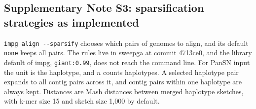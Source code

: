 \subsection*{Supplementary Note S3: sparsification strategies as implemented}

\texttt{impg align -{}-sparsify} chooses which pairs of genomes to align, and its default \texttt{none} keeps all pairs.
The rules live in sweepga \citep{Garrison2026sweepga} at commit 4713ce0, and the library default of impg, \texttt{giant:0.99}, does not reach the command line.
For PanSN input the unit is the haplotype, and $n$ counts haplotypes.
A selected haplotype pair expands to all contig pairs across it, and contig pairs within one haplotype are always kept.
Distances are Mash distances \citep{Ondov2016mash} between merged haplotype sketches, with k-mer size 15 and sketch size 1,000 by default.

